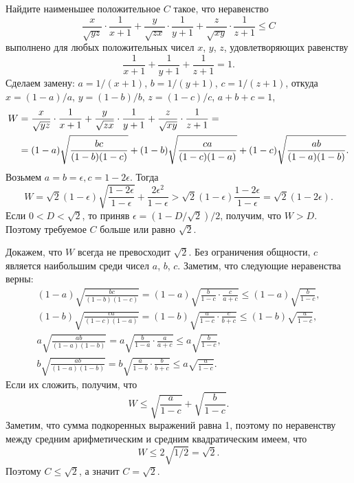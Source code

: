 \problem
Найдите наименьшее положительное $C$ такое, что неравенство
\[
    \frac{x}{\sqrt{yz}} \cdot \frac{1}{x+1}
    +
    \frac{y}{\sqrt{zx}} \cdot \frac{1}{y+1}
    +
    \frac{z}{\sqrt{xy}} \cdot \frac{1}{z+1}
\leq
    C
\]
выполнено для любых положительных чисел $x$, $y$, $z$, удовлетворяющих
равенству
\[
    \frac{1}{x+1} + \frac{1}{y+1} + \frac{1}{z+1}
=
    1
.\]
\solution
Сделаем замену:
$a = 1 / (x + 1)$, $b = 1 / (y + 1)$,  $c = 1 / (z + 1)$, откуда
$x = (1 - a) / a$, $y = (1 - b) / b$, $z = (1 - c) / c$,
$a + b + c = 1$,
\begin{align*}
    W
={}&
    \frac{x}{\sqrt{y z}} \cdot \frac{1}{x + 1}
    +
    \frac{y}{\sqrt{z x}} \cdot \frac{1}{y + 1}
    +
    \frac{z}{\sqrt{x y}} \cdot \frac{1}{z + 1}
=\\={}&
    (1 - a) \sqrt{\frac{b c \mathstrut}{(1 - b) (1 - c)}}
    +
    (1 - b) \sqrt{\frac{c a \mathstrut}{(1 - c) (1 - a)}}
    +
    (1 - c) \sqrt{\frac{a b \mathstrut}{(1 - a) (1 - b)}}
.\end{align*}
Возьмем $a = b = \epsilon, c = 1 - 2 \epsilon$.
Тогда 
\[
    W
=
    \sqrt{2} (1 - \epsilon) \sqrt{\frac{1 - 2 \epsilon}{1 - \epsilon}}
    +
    \frac{2{\epsilon}^2}{1 - \epsilon}
>
    \sqrt{2} (1 - \epsilon) \frac{1 - 2 \epsilon}{1 - \epsilon}
=
    \sqrt{2} (1 - 2 \epsilon).
\]
Если $0 < D < \sqrt{2}$, то приняв $\epsilon = (1 - D / \sqrt{2}) / 2$,
получим, что $W > D$.
Поэтому требуемое $C$ больше или равно $\sqrt{2}$.
\par
Докажем, что $W$ всегда не превосходит $\sqrt{2}$.
Без ограничения общности, $c$ является наибольшим среди чисел $a$, $b$, $c$.
Заметим, что следующие неравенства верны:
\begin{gather*}
    (1 - a) \sqrt{\frac{b c}{(1 - b) (1 - c)}}
=
    (1 - a) \sqrt{\frac{b}{1 - c} \cdot \frac{c}{a + c}}
\leq
    (1 - a) \sqrt{\frac{b}{1 - c}}
,\\
    (1 - b) \sqrt{\frac{c a}{(1 - c) (1 - a)}}
=
    (1 - b) \sqrt{\frac{a}{1 - c} \cdot \frac{c}{b + c}}
\leq
    (1 - b) \sqrt{\frac{a}{1 - c}}
,\\
    a \sqrt{\frac{a b}{(1 - a) (1 - b)}}
=
    a \sqrt{\frac{b}{1 - a} \cdot \frac{a}{a + c}}
\leq
    a \sqrt{\frac{b}{1 - c}}
,\\
    b \sqrt{\frac{a b}{(1 - a) (1 - b)}}
=
    b \sqrt{\frac{a}{1 - b} \cdot \frac{b}{b + c}}
\leq
    a \sqrt{\frac{a}{1 - c}}
.\end{gather*}
Если их сложить, получим, что 
\[
    W
\leq
    \sqrt{\frac{a}{1 - c}} + \sqrt{\frac{b}{1 - c}}
.\]
Заметим, что сумма подкоренных выражений равна 1, поэтому по неравенству
между средним арифметическим и средним квадратическим имеем, что
\[
    W
\leq
    2 \sqrt{1 / 2}
=
    \sqrt{2}
.\]
Поэтому $C \leq \sqrt{2}$, а значит $C = \sqrt{2}$.  
\endproblem
